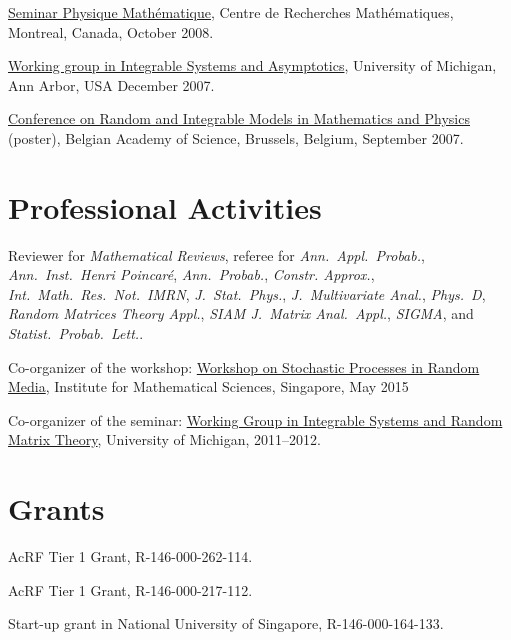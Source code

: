 \documentclass[12pt,a4paper]{article}
\newenvironment{item_list}{
 \begin{list}{}{
   \setlength{\leftmargin}{1.5em}
   \setlength{\itemsep}{0.25em}
   \setlength{\parskip}{0pt}
   \setlength{\parsep}{0.25em}
 }
}{
 \end{list}
}
\begin{document}
\begin{item_list}
\item
  \href{http://www.crm.umontreal.ca/cal/en/mois200810.html}{Seminar Physique Math\'{e}matique}, Centre de Recherches Math\'{e}matiques, Montreal, Canada, October 2008.
\item
  \href{http://www.math.lsa.umich.edu/~millerpd/WGISA_archives/WGISA_Fall_07.html}{Working group in Integrable Systems and Asymptotics}, University of Michigan, Ann Arbor, USA December 2007.
\item
  \href{http://magelhaes.hzs.be/RIMMP/}{Conference on Random and Integrable Models in Mathematics and Physics} (poster), Belgian Academy of Science, Brussels, Belgium, September 2007.
\end{item_list}

\section*{Professional Activities}

\begin{item_list}
\item Reviewer for \textit{Mathematical Reviews}, referee for \textit{Ann.\ Appl.\ Probab.}, \textit{Ann.\ Inst.\ Henri Poincar\'{e}}, \textit{Ann.\ Probab.}, \textit{Constr. Approx.}, \textit{Int.\ Math.\ Res.\ Not.\ IMRN}, \textit{J.\ Stat.\ Phys.}, \textit{J.\ Multivariate Anal.}, \textit{Phys.\ D}, \textit{Random Matrices Theory Appl.}, \textit{SIAM J.\ Matrix Anal.\ Appl.}, \textit{SIGMA}, and \textit{Statist.\ Probab.\ Lett.}.
\item Co-organizer of the workshop:
  \href{http://www2.ims.nus.edu.sg/Programs/015wrandom/index.php}{Workshop on Stochastic Processes in Random Media}, Institute for Mathematical Sciences, Singapore, May 2015
\item Co-organizer of the seminar:
  \href{http://www.math.lsa.umich.edu/seminars_events/events.php?eventdefid=43&dt_begin=2011-07-01&dt_end=2011-12-31}
  {Working Group in Integrable Systems and Random Matrix Theory}, University of Michigan, 2011--2012.
\end{item_list}

\section*{Grants}

\begin{item_list}
\item
  AcRF Tier 1 Grant, R-146-000-262-114.
\item
  AcRF Tier 1 Grant, R-146-000-217-112.
\item
  Start-up grant in National University of Singapore, R-146-000-164-133.
\end{item_list}
\end{document}
